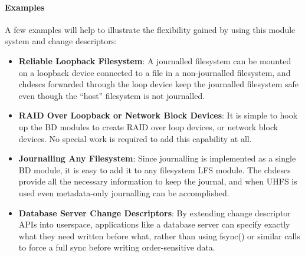 \preparagraphspacing{}
\paragraph{Examples}
\label{sec:examples}

A few examples will help to illustrate the flexibility gained by using this
module system and change descriptors:

\begin{itemize}
\item \itemvspace{} {\bf Reliable Loopback Filesystem}: A journalled filesystem
  can be mounted on a loopback device connected to a file in a non-journalled
  filesystem, and chdescs forwarded through the loop device keep the journalled
  filesystem safe even though the ``host'' filesystem is not journalled.
\item \itemvspace{} {\bf RAID Over Loopback or Network Block Devices}: It is
  simple to hook up the BD modules to create RAID over loop devices, or network
  block devices. No special work is required to add this capability at all.
\item \itemvspace{} {\bf Journalling Any Filesystem}: Since journalling is
  implemented as a single BD module, it is easy to add it to any filesystem LFS
  module. The chdescs provide all the necessary information to keep the journal,
  and when UHFS is used even metadata-only journalling can be accomplished.
\item \itemvspace{} {\bf Database Server Change Descriptors}: By extending
  change descriptor APIs into userspace, applications like a database server can
  specify exactly what they need written before what, rather than using fsync()
  or similar calls to force a full sync before writing order-sensitive data.
\end{itemize}
\postlistspacing{}
